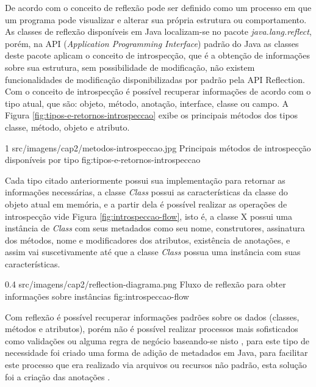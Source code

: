 \par De acordo com  o conceito de reflexão pode ser definido como um processo em que um programa pode visualizar e alterar sua própria estrutura ou comportamento. As classes de reflexão disponíveis em Java localizam-se no pacote \textit{java.lang.reflect}, porém, na API (\textit{Application Programming Interface}) padrão do Java as classes deste pacote aplicam o conceito de introspecção, que é a obtenção de informações sobre sua estrutura, sem possibilidade de modificação, não existem funcionalidades de modificação disponibilizadas por padrão pela API Reflection. Com o conceito de introspecção é possível recuperar informações de acordo com o tipo atual, que são: objeto, método, anotação, interface, classe ou campo. A Figura \ref{fig:tipos-e-retornos-introspeccao} exibe os principais métodos dos tipos classe, método, objeto e atributo. 

\begin{image}
{1} %
{src/imagens/cap2/metodos-introspeccao.jpg} %
{Principais métodos de introspecção disponíveis por tipo} %
{fig:tipos-e-retornos-introspeccao} %
{\cite{parson2000using}} %
\end{image}

\par Cada tipo citado anteriormente possui sua implementação para retornar as informações necessárias, a classe \textit{Class} possui as características da classe do objeto atual em memória, e a partir dela é possível realizar as operações de introspecção vide Figura \ref{fig:introspeccao-flow}, isto é, a classe X possui uma instância de \textit{Class} com seus metadados como seu nome, construtores, assinatura dos métodos, nome e modificadores dos atributos, existência de anotações, e assim vai suscetivamente até que a classe \textit{Class} possua uma instância com suas características.

\begin{image}
{0.4} %
{src/imagens/cap2/reflection-diagrama.png} %
{Fluxo de reflexão para obter informações sobre instâncias} %
{fig:introspeccao-flow} %
{} %
\end{image}

\par Com reflexão é possível recuperar informações padrões sobre os dados (classes, métodos e atributos), porém não é possível realizar processos mais sofisticados como validações ou alguma regra de negócio baseando-se nisto \cite{guerra2010architectural}, para este tipo de necessidade foi criado uma forma de adição de metadados em Java, para facilitar este processo que era realizado via arquivos ou recursos não padrão, esta solução foi a criação das anotações .

